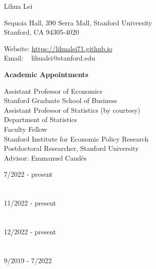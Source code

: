 \documentclass{article}
\begin{document}
\begin{Huge}
\noindent Lihua Lei
\end{Huge}

\vspace{5mm}
\begin{minipage}{0.6\linewidth}
  \flushleft
\noindent Sequoia Hall, 390 Serra Mall, Stanford University \\
\noindent Stanford, CA 94305-4020
\end{minipage}
\hfill
\begin{minipage}{0.4\linewidth}
  Website: \url{https://lihualei71.github.io}\\
  Email: \,\,\,\,\,lihualei@stanford.edu
\end{minipage}

\vspace{5mm}
\begin{large}
\noindent \textbf{Academic Appointments}
\end{large}
\vspace{5mm}

\begin{minipage}{0.65\linewidth}
  \noindent Assistant Professor of Economics \\
  Stanford Graduate School of Business\\

  \noindent Assistant Professor of Statistics (by courtesy) \\
  Department of Statistics\\

  \noindent Faculty Fellow \\
  Stanford Institute for Economic Policy Research \\

  \noindent Postdoctoral Researcher, Stanford University\\
  Advisor: Emmanuel Cand\`{e}s
\end{minipage}\hfill
\begin{minipage}{0.34\linewidth}
\flushright
\vspace{-3mm}
7/2022 - present\\
~\\
~\\
11/2022 - present\\
~\\
~\\
12/2022 - present\\
~\\
~\\
9/2019 - 7/2022 \\
\end{minipage}
\end{document}
